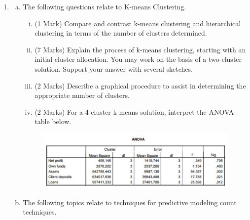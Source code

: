 \documentclass[a4paper,12pt]{article}
\begin{document}
\begin{enumerate}
\begin{enumerate}[(a)]
	
	\end{enumerate}

\newpage

	\item 
	\begin{enumerate}[(a)]


\item The following questions relate to K-means Clustering.

\begin{enumerate}[(i)]
	\item (1 Mark) Compare and contrast k-means clustering and hierarchical clustering in terms of the number of clusters determined.
	\item (7 Marks) Explain the process of k-means clustering, starting with an initial cluster allocation. 
	You may work on the basis of a two-cluster solution. Support your answer with several sketches.
	\item(2 Marks) Describe a graphical procedure to assist in determining the appropriate number of clusters.
	
	\item (2 Marks) For a 4 cluster k-means solution, interpret the ANOVA table below.
\end{enumerate}


\begin{figure}[h!]
	\centering
	\includegraphics[width=0.9\linewidth]{Cluster}
\end{figure}


	 
%
%
%
%
%
\item The following topics relate to techniques for predictive modeling count techniques.



\end{enumerate}
\end{enumerate}
\end{document}
